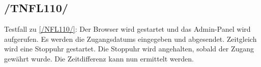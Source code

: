 \subsection*{/TNFL110/}

\label{/TNFL110/} Testfall zu \ref{/NFL110/}: Der \Gls{Browser} wird gestartet und das \Gls{Admin-Panel} wird aufgerufen.
Es werden die \Glspl{Zugangsdatum} eingegeben und abgesendet. Zeitgleich wird eine Stoppuhr gestartet.
Die Stoppuhr wird angehalten, sobald der Zugang gewährt wurde.
Die Zeitdifferenz kann nun ermittelt werden.